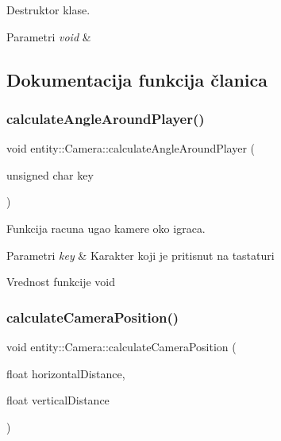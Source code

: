 Destruktor klase. 


\begin{DoxyParams}{Parametri}
{\em void} & \\
\hline
\end{DoxyParams}


\subsection{Dokumentacija funkcija članica}
\mbox{\label{classentity_1_1Camera_a519f8f9f625c56a94d8860c55a134ef3}} 
\subsubsection{\texorpdfstring{calculate\+Angle\+Around\+Player()}{calculateAngleAroundPlayer()}}
{\footnotesize\ttfamily void entity\+::\+Camera\+::calculate\+Angle\+Around\+Player (\begin{DoxyParamCaption}\item[{unsigned char}]{key }\end{DoxyParamCaption})\hspace{0.3cm}{\ttfamily [private]}}



Funkcija racuna ugao kamere oko igraca. 


\begin{DoxyParams}{Parametri}
{\em key} & Karakter koji je pritisnut na tastaturi \\
\hline
\end{DoxyParams}
\begin{DoxyReturn}{Vrednost funkcije}
void 
\end{DoxyReturn}
\mbox{\label{classentity_1_1Camera_a89f1d576fd701ea58b9509b243913952}} 
\subsubsection{\texorpdfstring{calculate\+Camera\+Position()}{calculateCameraPosition()}}
{\footnotesize\ttfamily void entity\+::\+Camera\+::calculate\+Camera\+Position (\begin{DoxyParamCaption}\item[{float}]{horizontal\+Distance,  }\item[{float}]{vertical\+Distance }\end{DoxyParamCaption})\hspace{0.3cm}{\ttfamily [private]}}



